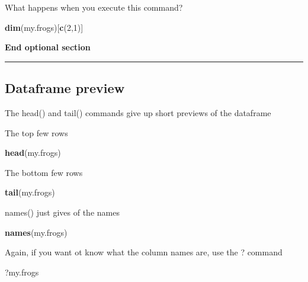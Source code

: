 \documentclass[]{book}
\newenvironment{Shaded}{\begin{snugshade}}{\end{snugshade}}
\newcommand{\KeywordTok}[1]{\textcolor[rgb]{0.13,0.29,0.53}{\textbf{#1}}}
\newcommand{\DecValTok}[1]{\textcolor[rgb]{0.00,0.00,0.81}{#1}}
\newcommand{\NormalTok}[1]{#1}
\theoremstyle{definition}
\theoremstyle{definition}
\theoremstyle{definition}
\theoremstyle{remark}
\begin{document}
What happens when you execute this command?

\begin{Shaded}
\begin{Highlighting}[]
\KeywordTok{dim}\NormalTok{(my.frogs)[}\KeywordTok{c}\NormalTok{(}\DecValTok{2}\NormalTok{,}\DecValTok{1}\NormalTok{)]}
\end{Highlighting}
\end{Shaded}

\textbf{End optional section}

\begin{center}\rule{0.5\linewidth}{\linethickness}\end{center}

\subsection{Dataframe preview}\label{dataframe-preview}

The head() and tail() commands give up short previews of the dataframe

The top few rows

\begin{Shaded}
\begin{Highlighting}[]
\KeywordTok{head}\NormalTok{(my.frogs)}
\end{Highlighting}
\end{Shaded}

The bottom few rows

\begin{Shaded}
\begin{Highlighting}[]
\KeywordTok{tail}\NormalTok{(my.frogs)}
\end{Highlighting}
\end{Shaded}

names() just gives of the names

\begin{Shaded}
\begin{Highlighting}[]
\KeywordTok{names}\NormalTok{(my.frogs)}
\end{Highlighting}
\end{Shaded}

Again, if you want ot know what the column names are, use the ? command

\begin{Shaded}
\begin{Highlighting}[]
\NormalTok{?my.frogs}
\end{Highlighting}
\end{Shaded}
\end{document}
